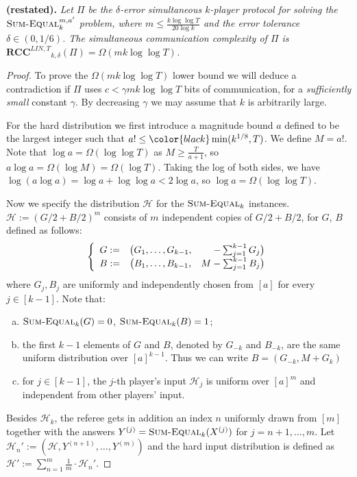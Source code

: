 \documentclass{toc}
\newcommand{\error}{\ensuremath{\delta}}
\newcommand{\bigomega}[1]{\ensuremath{{\Omega \left( {#1} \right)}}}
\newcommand{\eqdef}{\ensuremath{:=}}
\newcommand{\rcclinT}{\ensuremath{\mathbf{RCC}^{LIN,T}}}
\newcommand{\sumequal}{\textsc{Sum-Equal} }
\begin{document}
\noindent\textbf{ (restated).} 
{\it
	Let $\Pi$ be the $\error$-error simultaneous $k$-player protocol for solving the $\sumequal_k^{m,a'}$ problem, where 
	$m \le\frac{k\log\log T}{20\log k}$ and the error tolerance $\error \in (0,1/6)$.
	The simultaneous communication complexity of $\Pi$ is $\rcclinT_{k,\error}(\Pi)=\bigomega{mk\log\log T}$.
}
\medskip
\begin{proof}
	To prove the $\bigomega{mk\log\log T}$ lower bound we will deduce a contradiction if $\Pi$ uses $c<\gamma mk\log\log T$ bits of communication, for a \emph{sufficiently small} constant $\gamma$.
	By decreasing $\gamma$ we may assume that $k$ is arbitrarily large.

	For the hard distribution we first introduce a magnitude bound $a$ defined to be the largest integer such that $a! \le {\color{black}\min(k^{1/8},T)}$. We define $M = a!$. {\color{black}Note that $\log a = \Omega(\log\log T)$ as $M \ge \frac{T}{a+1}$, so $a \log a = \Omega(\log M) = \Omega(\log T)$. Taking the log of both sides, we have $\log(a \log a) = \log a + \log \log a < 2\log a$, so $\log a = \Omega(\log \log T)$.}


	Now we specify the distribution $\mathcal{H}$ for the $\sumequal_k$ instances.
	$\mathcal{H} \eqdef \left(G/2+B/2\right)^m$ consists of $m$ independent copies of $G/2+B/2$,
	for $G$, $B$ defined as follows:
	$$
		\left\{
		\begin{array}{c c r}
			G \eqdef &	\big( G_1,\dots, G_{k-1} , &-\sum_{j=1}^{k-1} G_j \big)		\\
			B \eqdef &  \big( B_1,\dots, B_{k-1} , &M-\sum_{j=1}^{k-1} B_j \big)
		\end{array}		
		\right.
	$$
	where $G_j,B_j$ are uniformly and independently chosen from $[a]$ for every $j\in[k-1]$. 
	Note that:
	{\color{black}
	\begin{enumerate}[(a)]
	    \item $\sumequal_{k}(G)=0$, $\sumequal_{k}(B)=1$; 
	    \item the first $k-1$ elements of $G$ and $B$, denoted by $G_{-k}$ and $B_{-k}$, are the same uniform distribution over $[a]^{k-1}$. Thus we can write $B=(G_{-k},M+G_k)$
	    \item for $j\in[k-1]$, the $j$-th player's input $\mathcal{H}_j$ is uniform over $[a]^m$ and independent from other players' input.
	\end{enumerate}
}
	Besides $\mathcal{H}_k$, the referee gets in addition an index $n$ uniformly drawn from $[m]$ together with the answers $Y^{(j)}=\sumequal_k(X^{(j)})$ for $j=n+1,\ldots,m$.
	Let $\mathcal{H}_n'\eqdef (\mathcal{H},Y^{(n+1)},\ldots,Y^{(m)})$
	and the hard input distribution is defined as $\mathcal{H}'\eqdef %
	\sum_{n=1}^m \frac{1}{m}\cdot \mathcal{H}_n'$.
	


\end{proof}
\end{document}
